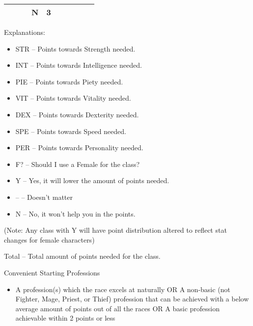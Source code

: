 \documentclass[12pt]{article}
\providecommand{\tightlist}{%
  \setlength{\itemsep}{0pt}\setlength{\parskip}{0pt}}
\begin{document}
\begin{longtable}[]{@{}llllllllll@{}}
\begin{minipage}[t]{0.06\columnwidth}
\strut\end{minipage} &
\begin{minipage}[t]{0.06\columnwidth}\raggedright\strut
\strut\end{minipage} &
\begin{minipage}[t]{0.06\columnwidth}\raggedright\strut
\strut\end{minipage} &
\begin{minipage}[t]{0.07\columnwidth}\raggedright\strut
N
\strut\end{minipage} &
\begin{minipage}[t]{0.08\columnwidth}\raggedright\strut
3
\strut\end{minipage}\tabularnewline
\bottomrule
\end{longtable}

Explanations:

\begin{itemize}
\tightlist
\item
  STR -- Points towards Strength needed.
\item
  INT -- Points towards Intelligence needed.
\item
  PIE -- Points towards Piety needed.
\item
  VIT -- Points towards Vitality needed.
\item
  DEX -- Points towards Dexterity needed.
\item
  SPE -- Points towards Speed needed.
\item
  PER -- Points towards Personality needed.
\item
  F? -- Should I use a Female for the class?
\item
  Y -- Yes, it will lower the amount of points needed.
\item
  -- -- Doesn't matter
\item
  N -- No, it won't help you in the points.
\end{itemize}

(Note: Any class with Y will have point distribution altered to reflect
stat changes for female characters)

Total -- Total amount of points needed for the class.

Convenient Starting Professions

\begin{itemize}
\tightlist
\item
  A profession(s) which the race excels at naturally OR A non-basic (not
  Fighter, Mage, Priest, or Thief) profession that can be achieved with
  a below average amount of points out of all the races OR A basic
  profession achievable within 2 points or less
\end{itemize}
\end{document}
